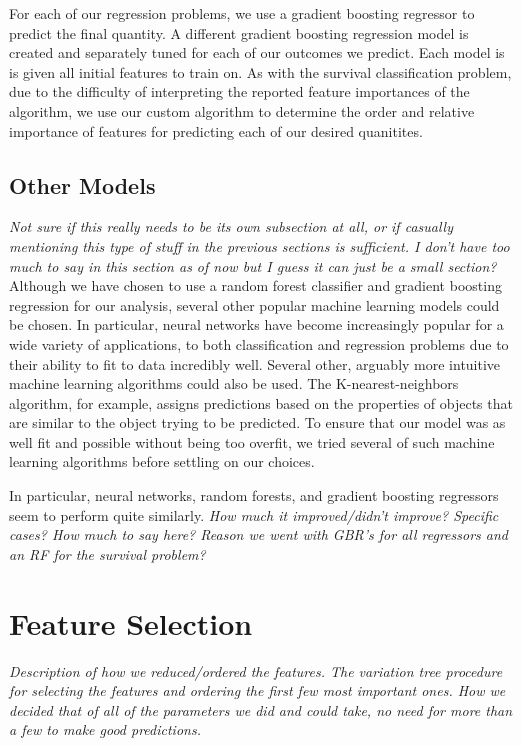 \documentclass[fleqn,usenatbib]{mnras}
\begin{document}
 For each of our regression problems, we use a gradient boosting regressor to predict the final quantity. A different gradient boosting regression model is created and separately tuned for each of our outcomes we predict. Each model is is given all initial features to train on. As with the survival classification problem, due to the difficulty of interpreting the reported feature importances of the algorithm, we use our custom algorithm to determine the order and relative importance of features for predicting each of our desired quanitites.

\subsection{Other Models}
\label{sec:other models} %
\textit{Not sure if this really needs to be its own subsection at all, or if casually mentioning this type of stuff in the previous sections is sufficient. I don't have too much to say in this section as of now but I guess it can just be a small section?}
Although we have chosen to use a random forest classifier and gradient boosting regression for our analysis, several other popular machine learning models could be chosen. In particular, neural networks have become increasingly popular for a wide variety of applications, to both classification and regression problems due to their ability to fit to data incredibly well. Several other, arguably more intuitive machine learning algorithms could also be used. The K-nearest-neighbors algorithm, for example, assigns predictions based on the properties of objects that are similar to the object trying to be predicted. To ensure that our model was as well fit and possible without being too overfit, we tried several of such machine learning algorithms before settling on our choices.

In particular, neural networks, random forests, and gradient boosting regressors seem to perform quite similarly. \textit{How much it improved/didn't improve? Specific cases? How much to say here? Reason we went with GBR's for all regressors and an RF for the survival problem?}


\section{Feature Selection}
\label{sec:feature selection} %
\textit{Description of how we reduced/ordered the features. The variation tree procedure for selecting the features and ordering the first few most important ones. How we decided that of all of the parameters we did and could take, no need for more than a few to make good predictions.}
\end{document}
